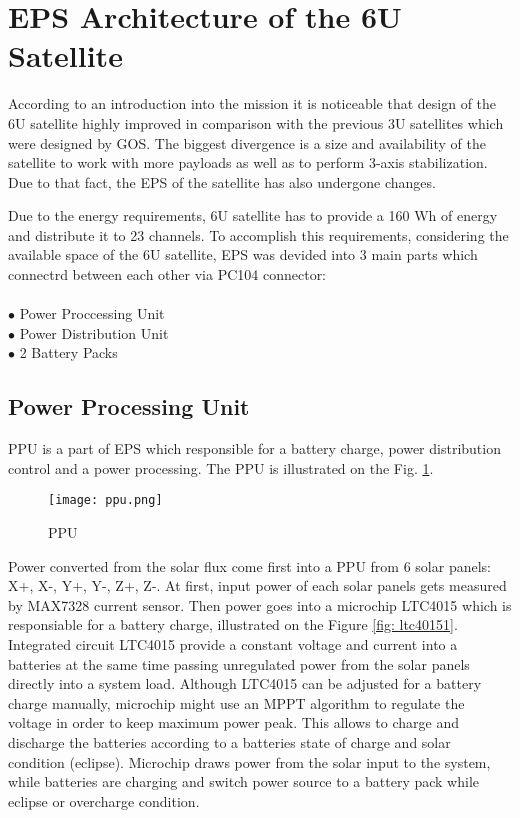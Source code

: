  
  \section{EPS Architecture of the 6U Satellite}
  According to an introduction into the mission it is noticeable that design of the 6U satellite highly improved in comparison with the previous 3U satellites which were designed by GOS. The biggest divergence is a size and availability of the satellite to work with more payloads as well as to perform 3-axis stabilization. Due to that fact, the EPS of the satellite has also undergone changes.
  
  Due to the energy requirements, 6U satellite has to provide a 160 Wh of energy and  distribute it to 23 channels. To accomplish this requirements, considering the available space of the 6U satellite, EPS was devided into 3 main parts which connectrd between each other via PC104 connector:\\ \\
  $\bullet$ Power Proccessing Unit\\
  $\bullet$ Power Distribution Unit\\
  $\bullet$ 2 Battery Packs\\
  
   \subsection{Power Processing Unit}
   PPU is a part of EPS which responsible for a battery charge, power distribution control and a power processing. The PPU is illustrated on the Fig. \ref{fig: psu122}.
   
   \begin{figure}[h]
   	\centering
   	\texttt{[image: ppu.png]}
   	\caption{PPU}
   	\label{fig: psu122}
   \end{figure}
   
   Power converted from the solar flux come first into a PPU from 6 solar panels: X+, X-, Y+, Y-, Z+, Z-. At first, input power of each solar panels gets measured by MAX7328 current sensor. Then power goes into a microchip LTC4015 which is responsiable for a battery charge, illustrated on the Figure \ref{fig: ltc40151}. Integrated circuit LTC4015 provide a constant voltage and current into a batteries at the same time passing unregulated power from the solar panels directly into a system load. Although LTC4015 can be adjusted for a battery charge manually, microchip might use an MPPT algorithm to regulate the voltage in order to keep maximum power peak. This allows to charge and discharge the batteries according to a batteries state of charge and solar condition (eclipse). Microchip draws power from the solar input to the system, while batteries are charging and switch power source to a battery pack while eclipse or overcharge condition.
   
